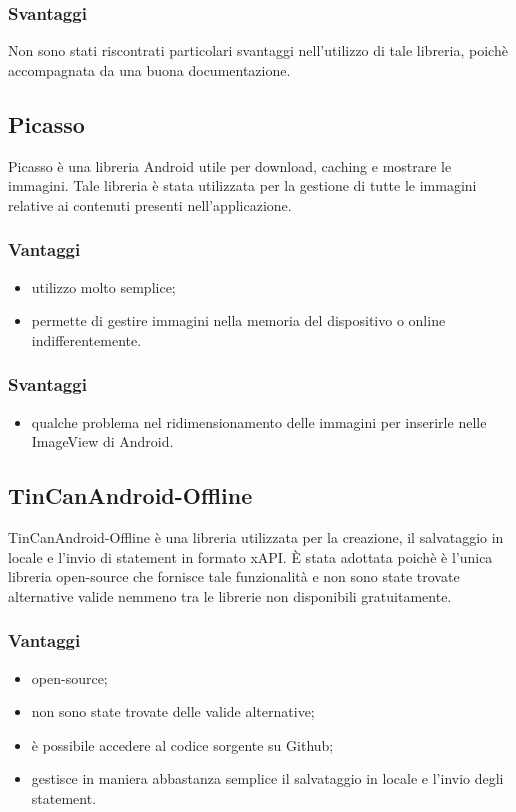 \documentclass[../Tesi.tex]{subfiles}
\begin{document}
		\subsubsection{Svantaggi}
			Non sono stati riscontrati particolari svantaggi nell'utilizzo di tale libreria, poichè accompagnata da una buona documentazione.

	\subsection{Picasso}
		Picasso è una libreria Android utile per download, caching e mostrare le immagini. Tale libreria è stata utilizzata per la gestione di tutte le immagini relative ai contenuti presenti nell'applicazione.
		\subsubsection{Vantaggi}
			\begin{itemize}
				\item utilizzo molto semplice;
				\item permette di gestire immagini nella memoria del dispositivo o online indifferentemente.
			\end{itemize}
		\subsubsection{Svantaggi}
			\begin{itemize}
				\item qualche problema nel ridimensionamento delle immagini per inserirle nelle ImageView di Android.
			\end{itemize}

	\subsection{TinCanAndroid-Offline}
		TinCanAndroid-Offline è una libreria utilizzata per la creazione, il salvataggio in locale e l'invio di statement in formato xAPI. È stata adottata poichè è l'unica libreria open-source che fornisce tale funzionalità e non sono state trovate alternative valide nemmeno tra le librerie non disponibili gratuitamente.
		\subsubsection{Vantaggi}
			\begin{itemize}
				\item open-source;
				\item non sono state trovate delle valide alternative;
				\item è possibile accedere al codice sorgente su Github;
				\item gestisce in maniera abbastanza semplice il salvataggio in locale e l'invio degli statement.
			\end{itemize}
\end{document}
